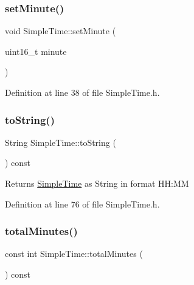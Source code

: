 \subsubsection{\texorpdfstring{setMinute()}{setMinute()}}
{\footnotesize\ttfamily void Simple\+Time\+::set\+Minute (\begin{DoxyParamCaption}\item[{uint16\+\_\+t}]{minute }\end{DoxyParamCaption})\hspace{0.3cm}{\ttfamily [inline]}}



Definition at line 38 of file Simple\+Time.\+h.

\mbox{\label{class_simple_time_a9de383bf9aaf23dbba9b13e0b9b4f0ed}} 
\subsubsection{\texorpdfstring{toString()}{toString()}}
{\footnotesize\ttfamily String Simple\+Time\+::to\+String (\begin{DoxyParamCaption}{ }\end{DoxyParamCaption}) const\hspace{0.3cm}{\ttfamily [inline]}}

\begin{DoxyReturn}{Returns}
\mbox{\hyperlink{class_simple_time}{Simple\+Time}} as String in format HH\+:MM 
\end{DoxyReturn}


Definition at line 76 of file Simple\+Time.\+h.

\mbox{\label{class_simple_time_a9fd5a5025ccd3bd60d4049c5c113ec4c}} 
\subsubsection{\texorpdfstring{totalMinutes()}{totalMinutes()}}
{\footnotesize\ttfamily const int Simple\+Time\+::total\+Minutes (\begin{DoxyParamCaption}{ }\end{DoxyParamCaption}) const\hspace{0.3cm}{\ttfamily [inline]}}



